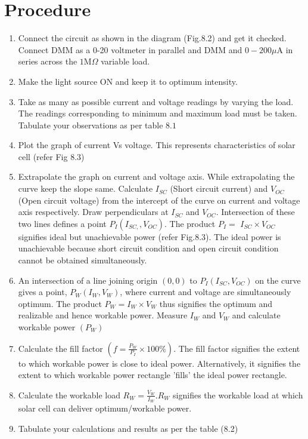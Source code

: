 \documentclass[12pt]{article}
\begin{document}
\section{Procedure}
\begin{enumerate}
	 
	\item Connect the circuit as shown in the diagram (Fig.8.2) and get it checked. Connect DMM as a 0-20 voltmeter in parallel and DMM and $0-200 \mu \mathrm{A}$ in series across the $1 \mathrm{M} \Omega$ variable load.
	\item Make the light source ON and keep it to optimum intensity.
	\item Take as many as possible current and voltage readings by varying the load. The readings corresponding to minimum and maximum load must be taken. Tabulate your observations as per table $8.1$
	\item Plot the graph of current Vs voltage. This represents characteristics of solar cell (refer Fig 8.3)
	\item Extrapolate the graph on current and voltage axis. While extrapolating the curve keep the slope same. Calculate $I_{S C}$ (Short circuit current) and $V_{O C}$ (Open circuit voltage) from the intercept of the curve on current and voltage axis respectively. Draw perpendiculars at $I_{S C}$ and $V_{O C}$. Intersection of these two lines defines a point $P_{I}\left(I_{S C,}, V_{O C}\right)$. The product $P_{I}=$ $I_{S C} \times V_{O C}$ signifies ideal but unachievable power (refer Fig.8.3). The ideal power is unachievable because short circuit condition and open circuit condition cannot be obtained simultaneously.
	\item An intersection of a line joining origin $(0,0)$ to $P_{I}\left(I_{S C}, V_{O C}\right)$ on the curve gives a point, $P_{W}\left(I_{W}, V_{W}\right)$, where current and voltage are simultaneously optimum. The product $P_{W}=I_{W} \times V_{W}$ thus signifies the optimum and realizable and hence workable power. Measure $I_{W}$ and $V_{W}$ and calculate workable power $\left(P_{W}\right)$
	\item Calculate the fill factor $\left(f=\frac{P_{W}}{P_{I}} \times 100 \%\right)$. The fill factor signifies the extent to which workable power is close to ideal power. Alternatively, it signifies the extent to which workable power rectangle 'fills' the ideal power rectangle.
	\item Calculate the workable load $R_{W}=\frac{V_{W}}{I_{W}} . R_{W}$ signifies the workable load at which solar cell can deliver optimum/workable power.
	\item Tabulate your calculations and results as per the table (8.2)
\end{enumerate}
\end{document}
